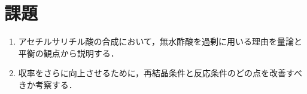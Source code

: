 \section{課題}
\begin{enumerate}
    \item アセチルサリチル酸の合成において，無水酢酸を過剰に用いる理由を量論と平衡の観点から説明する．
    \item 収率をさらに向上させるために，再結晶条件と反応条件のどの点を改善すべきか考察する．
\end{enumerate}